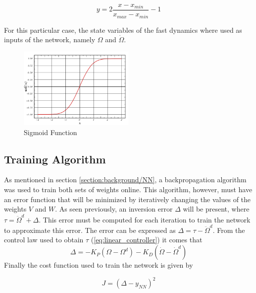 \begin{equation}
y=2\dfrac{x-x_{min}}{x_{max}-x_{min}}-1
\label{eq:normalisation}
\end{equation}

For this  particular case, the state variables of the fast dynamics where used as inputs of the network, namely $\Omega$ and $\dot{\Omega}$.

\begin{figure}[!htb]
  \centering
  \includegraphics[width=0.5\textwidth]{Figures/sigmoid.png}
  \caption[Sigmoid Function]{Sigmoid Function}
  \label{fig:sigmoid}
\end{figure}

\subsection{Training Algorithm}

As mentioned in section \ref{section:background/NN}, a backpropagation algorithm was used to train both sets of weights online. This algorithm, however, must have an error function that will be minimized by iteratively changing the values of the weights $V$ and $W$. As seen previously, an inversion error $\Delta$ will be present, where $\tau = \ddot{\Omega}^d + \Delta$. This error must be computed for each iteration to train the network to approximate this error. The error can be expressed as $\Delta=\tau - \ddot{\Omega}^d$.
From the control law used to obtain $\tau$ (\ref{eq:linear_controller}) it comes that
\begin{equation}
\Delta = -K_P(\Omega-\Omega^d)-K_D(\dot{\Omega}-\dot{\Omega}^d)
\label{eq:inversion_error}
\end{equation}
Finally the cost function used to train the network is given by

\begin{equation}
J=(\Delta-y_{NN})^2
\label{eq:NN_cost}
\end{equation}

